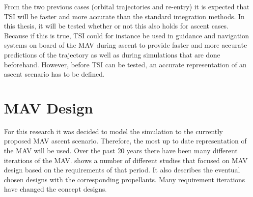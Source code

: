 From the two previous cases (orbital trajectories and re-entry) it is expected that \ac{TSI} will be faster and more accurate than the standard integration methods. In this thesis, it will be tested whether or not this also holds for ascent cases. Because if this is true, \ac{TSI} could for instance be used in guidance and navigation systems on board of the \ac{MAV} during ascent to provide faster and more accurate predictions of the trajectory as well as during simulations that are done beforehand. However, before \ac{TSI} can be tested, an accurate representation of an ascent scenario has to be defined. 
 


\section{\ac{MAV} Design}
\label{sec:mavDesign}
For this research it was decided to model the simulation to the currently proposed \ac{MAV} ascent scenario. Therefore, the most up to date representation of the \ac{MAV} will be used. Over the past 20 years there have been many different iterations of the \ac{MAV}.  shows a number of different studies that focused on \ac{MAV} design based on the requirements of that period. It also describes the eventual chosen designs with the corresponding propellants. Many requirement iterations have changed the concept designs.



